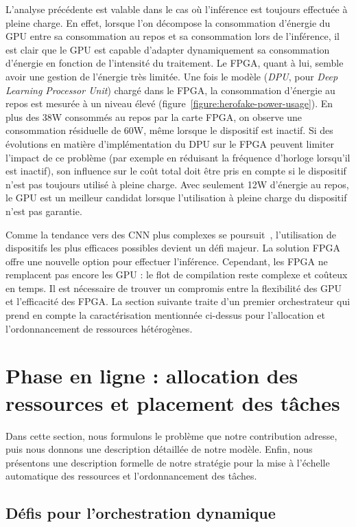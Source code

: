 L'analyse précédente est valable dans le cas où l'inférence est toujours effectuée à pleine charge. En effet, lorsque l'on décompose la consommation d'énergie du GPU entre sa consommation au repos et sa consommation lors de l'inférence, il est clair que le GPU est capable d'adapter dynamiquement sa consommation d'énergie en fonction de l'intensité du traitement. Le FPGA, quant à lui, semble avoir une gestion de l'énergie très limitée. Une fois le modèle (\textit{DPU}, pour \textit{Deep Learning Processor Unit}) chargé dans le FPGA, la consommation d'énergie au repos est mesurée à un niveau élevé (figure~\ref{figure:herofake-power-usage}). En plus des 38W consommés au repos par la carte FPGA, on observe une consommation résiduelle de 60W, même lorsque le dispositif est inactif. Si des évolutions en matière d'implémentation du DPU sur le FPGA peuvent limiter l'impact de ce problème (par exemple en réduisant la fréquence d'horloge lorsqu'il est inactif), son influence sur le coût total doit être pris en compte si le dispositif n'est pas toujours utilisé à pleine charge. Avec seulement 12W d'énergie au repos, le GPU est un meilleur candidat lorsque l'utilisation à pleine charge du dispositif n'est pas garantie.

Comme la tendance vers des CNN plus complexes se poursuit~\cite{8807741}, l'utilisation de dispositifs les plus efficaces possibles devient un défi majeur. La solution FPGA offre une nouvelle option pour effectuer l'inférence. Cependant, les FPGA ne remplacent pas encore les GPU : le flot de compilation reste complexe et coûteux en temps. Il est nécessaire de trouver un compromis entre la flexibilité des GPU et l'efficacité des FPGA. La section suivante traite d'un premier orchestrateur qui prend en compte la caractérisation mentionnée ci-dessus pour l'allocation et l'ordonnancement de ressources hétérogènes.

\section{Phase en ligne : allocation des ressources et placement des tâches}
\label{section:herofake-online}

Dans cette section, nous formulons le problème que notre contribution adresse, puis nous donnons une description détaillée de notre modèle. Enfin, nous présentons une description formelle de notre stratégie pour la mise à l'échelle automatique des ressources et l'ordonnancement des tâches.

\subsection{Défis pour l'orchestration dynamique}

